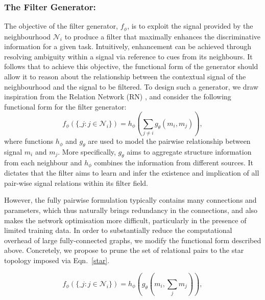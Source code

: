 \subsubsection{The Filter Generator:} The objective of the filter generator, $f_\phi$, is to exploit the signal provided by the  neighbourhood $\mathcal{N}_i$ to produce a filter that maximally enhances the discriminative information for a given task. Intuitively, enhancement can be achieved through resolving ambiguity within a signal via reference to cues from its neighbours. It follows that to achieve this objective, the functional form of the generator should allow it to reason about the relationship between the contextual signal of the neighbourhood and the signal to be filtered.  To design such a generator, we draw inspiration from the Relation Network (RN) \cite{santoro2017simple}, and consider the following functional form for the filter generator:
\begin{equation} \label{pairwise} 
 f_\phi (\{\bm_j: j \in \mathcal{N}_i\}) = h_\phi (\sum_{j\neq i} g_\theta (m_i,m_j)),
\end{equation}
where functions $h_\phi$ and $g_\theta$ are used to model the pairwise relationship between signal $m_i$ and  $m_j$. More specifically, $g_\theta$ aims to aggregate structure information from each neighbour and $h_\phi$ combines the information from different sources. It dictates that the filter aims to learn and infer the existence and implication of all pair-wise signal relations within its filter field. 


However, the fully pairwise formulation typically contains many connections and parameters, which thus naturally brings redundancy in the connections, and also makes the network optimisation more difficult, particularly in the presence of limited training data. In order to substantially reduce the computational overhead of large fully-connected graphs, we modify the functional form described above.  Concretely, we propose to prune the set of relational pairs to the star topology imposed via Eqn.~\ref{star}.



\begin{equation} \label{star} 
 f_\phi (\{\bm_j: j \in \mathcal{N}_i\}) = h_\phi (g_\theta (m_i,\sum_{j} m_j)),
\end{equation}

